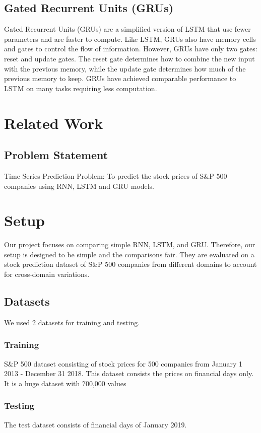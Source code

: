 \documentclass{article}
\begin{document}
\subsection{Gated Recurrent Units (GRUs)}
Gated Recurrent Units (GRUs) are a simplified version of LSTM that use fewer parameters and are faster to compute. Like LSTM, GRUs also have memory cells and gates to control the flow of information. However, GRUs have only two gates: reset and update gates. The reset gate determines how to combine the new input with the previous memory, while the update gate determines how much of the previous memory to keep. GRUs have achieved comparable performance to LSTM on many tasks requiring less computation.

\section{Related Work}
\label{gen_inst}
\subsection{Problem Statement}
Time Series Prediction Problem: To predict the stock prices of S\&P 500 companies using RNN, LSTM and GRU models.

\section{Setup}
\label{headings}
Our project focuses on comparing simple RNN, LSTM, and GRU. Therefore, our setup is designed to be simple and the comparisons fair. They are evaluated on a stock prediction dataset of S\&P 500 companies from different domains to account for cross-domain variations.

\subsection{Datasets}
We used 2 datasets for training and testing.
\subsubsection {Training}
S\&P 500 dataset consisting of stock prices for 500 companies from January 1 2013 - December 31 2018. This dataset consists the prices on financial days only. It is a huge dataset with \~ 700,000 values
\subsubsection {Testing}
The test dataset consists of financial days of January 2019.
\end{document}
